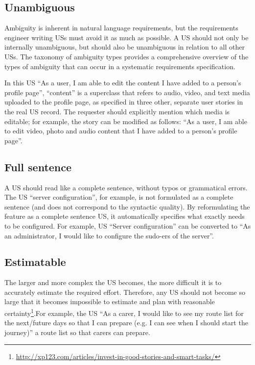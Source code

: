 \subsection*{\normalsize{Unambiguous}}
Ambiguity is inherent in natural language requirements, but the requirements engineer writing USs must avoid it as much as possible. A US should not only be internally unambiguous, but should also be unambiguous in relation to all other USs. The taxonomy of ambiguity types \cite{berry2004ambiguity} provides a comprehensive overview of the types of ambiguity that can occur in a systematic requirements specification.

In this US \enquote{As a user, I am able to edit the content I have added to a person's profile page}, \enquote{content} is a superclass that refers to audio, video, and text media uploaded to the profile page, as specified in three other, separate user stories in the real US record. The requester should explicitly mention which media is editable; for example, the story can be modified as follows: \enquote{As a user, I am able to edit video, photo and audio content that I have added to a person's profile page}.
\subsection*{\normalsize{Full sentence}}
A US should read like a complete sentence, without typos or grammatical errors. The US \enquote{server configuration}, for example, is not formulated as a complete sentence (and does not correspond to the syntactic quality). By reformulating the feature as a complete sentence US, it automatically specifies what exactly needs to be configured. For example, US \enquote{Server configuration} can be converted to \enquote{As an administrator, I would like to configure the sudo-ers of the server}.
\subsection*{\normalsize{Estimatable}}
The larger and more complex the US becomes, the more difficult it is to accurately estimate the required effort. Therefore, any US should not become so large that it becomes impossible to estimate and plan with reasonable certainty\footnote{\href{http://xp123.com/articles/invest-in-good-stories-and-smart-tasks/}{http://xp123.com/articles/invest-in-good-stories-and-smart-tasks/}}.For example, the US \enquote{As a carer, I would like to see my route list for the next/future days so that I can prepare (e.g. I can see when I should start the journey)} a route list so that carers can prepare.

